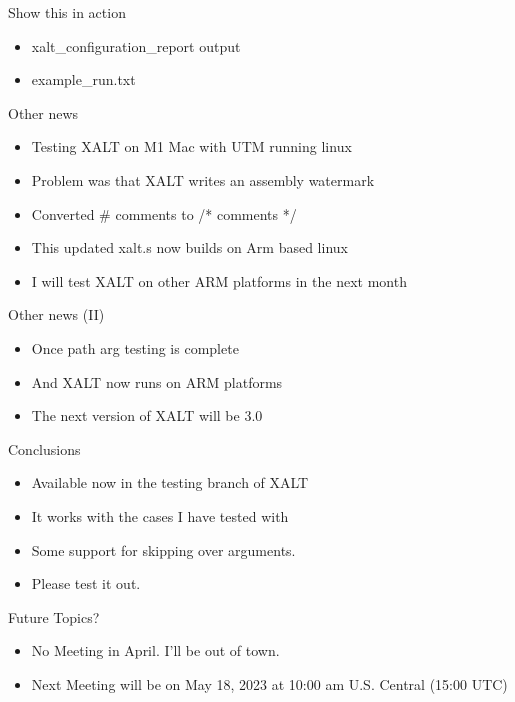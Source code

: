 \documentclass{beamer}
\begin{document}
\begin{frame}{Show this in action}
  \begin{itemize}
    \item xalt\_configuration\_report output
    \item example\_run.txt
  \end{itemize}
\end{frame}

\begin{frame}{Other news}
  \begin{itemize}
    \item Testing XALT on M1 Mac with UTM running linux
    \item Problem was that XALT writes an assembly watermark
    \item Converted # comments to /* comments */
    \item This updated xalt.s now builds on Arm based linux
    \item I will test XALT on other ARM platforms in the next month
  \end{itemize}
\end{frame}

\begin{frame}{Other news (II)}
  \begin{itemize}
    \item Once path arg testing is complete
    \item And XALT now runs on ARM platforms
    \item The next version of XALT will be 3.0
  \end{itemize}
\end{frame}

\begin{frame}{Conclusions}
  \begin{itemize}
    \item Available now in the testing branch of XALT
    \item It works with the cases I have tested with
    \item Some support for skipping over arguments.
    \item Please test it out.
  \end{itemize}
\end{frame}




\begin{frame}{Future Topics?}
  \begin{itemize}
    \item No Meeting in April.  I'll be out of town.
    \item Next Meeting will be on May 18, 2023 at 10:00 am
      U.S. Central (15:00 UTC)
  \end{itemize}
\end{frame}

%
\end{document}
